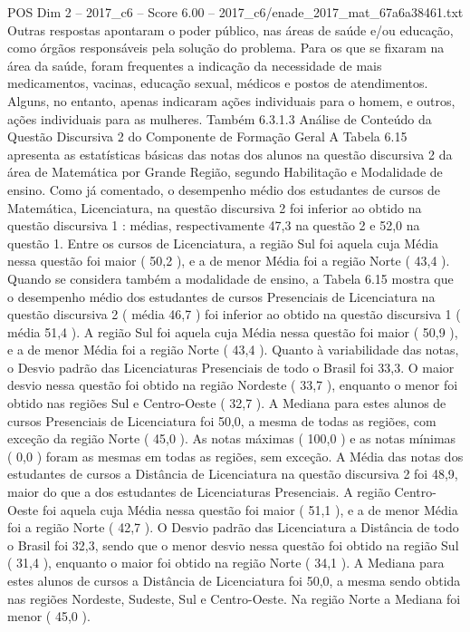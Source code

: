 \begin{textsample}{POS Dim 2 – 2017\_c6 – Score 6.00 – 2017\_c6/enade\_2017\_mat\_67a6a38461.txt}
Outras respostas apontaram o poder público, nas áreas de saúde e/ou educação, como órgãos responsáveis pela solução do problema.
Para os que se fixaram na área da saúde, foram frequentes a indicação da necessidade de mais medicamentos, vacinas, educação sexual, médicos e postos de atendimentos.
Alguns, no entanto, apenas indicaram ações individuais para o homem, e outros, ações individuais para as mulheres.
Também 6.3.1.3 Análise de Conteúdo da Questão Discursiva 2 do Componente de Formação Geral A Tabela 6.15 apresenta as estatísticas básicas das notas dos alunos na questão discursiva 2 da área de Matemática por Grande Região, segundo Habilitação e Modalidade de ensino.
Como já comentado, o desempenho médio dos estudantes de cursos de Matemática, Licenciatura, na questão discursiva 2 foi inferior ao obtido na questão discursiva 1 : médias, respectivamente 47,3 na questão 2 e 52,0 na questão 1.
Entre os cursos de Licenciatura, a região Sul foi aquela cuja Média nessa questão foi maior ( 50,2 ), e a de menor Média foi a região Norte ( 43,4 ).
Quando se considera também a modalidade de ensino, a Tabela 6.15 mostra que o desempenho médio dos estudantes de cursos Presenciais de Licenciatura na questão discursiva 2 ( média 46,7 ) foi inferior ao obtido na questão discursiva 1 ( média 51,4 ).
A região Sul foi aquela cuja Média nessa questão foi maior ( 50,9 ), e a de menor Média foi a região Norte ( 43,4 ).
Quanto à variabilidade das notas, o Desvio padrão das Licenciaturas Presenciais de todo o Brasil foi 33,3.
O maior desvio nessa questão foi obtido na região Nordeste ( 33,7 ), enquanto o menor foi obtido nas regiões Sul e Centro-Oeste ( 32,7 ).
A Mediana para estes alunos de cursos Presenciais de Licenciatura foi 50,0, a mesma de todas as regiões, com exceção da região Norte ( 45,0 ).
As notas máximas ( 100,0 ) e as notas mínimas ( 0,0 ) foram as mesmas em todas as regiões, sem exceção.
A Média das notas dos estudantes de cursos a Distância de Licenciatura na questão discursiva 2 foi 48,9, maior do que a dos estudantes de Licenciaturas Presenciais.
A região Centro-Oeste foi aquela cuja Média nessa questão foi maior ( 51,1 ), e a de menor Média foi a região Norte ( 42,7 ).
O Desvio padrão das Licenciatura a Distância de todo o Brasil foi 32,3, sendo que o menor desvio nessa questão foi obtido na região Sul ( 31,4 ), enquanto o maior foi obtido na região Norte ( 34,1 ).
A Mediana para estes alunos de cursos a Distância de Licenciatura foi 50,0, a mesma sendo obtida nas regiões Nordeste, Sudeste, Sul e Centro-Oeste.
Na região Norte a Mediana foi menor ( 45,0 ).

\end{textsample}
